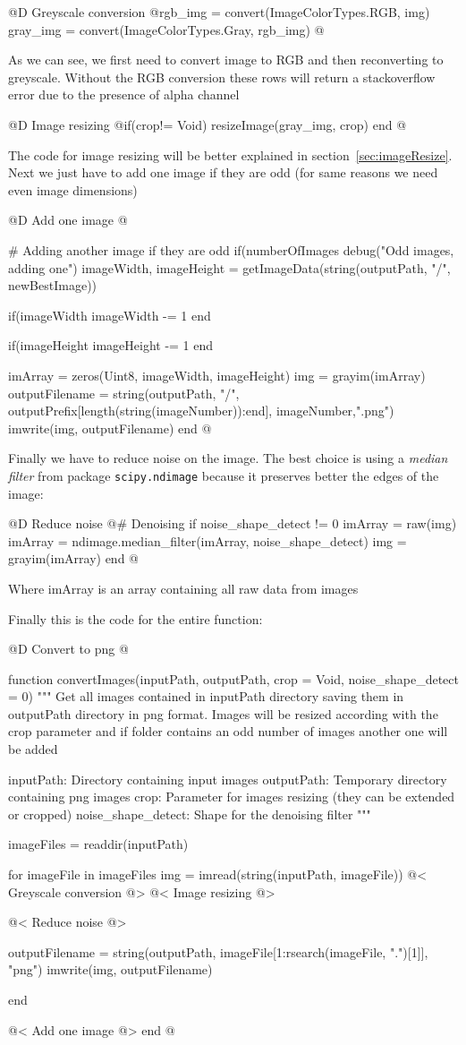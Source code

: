 \documentclass[11pt,oneside]{article}	%
\begin{document}
@D Greyscale conversion
@{rgb_img = convert(Image{ColorTypes.RGB}, img)
gray_img = convert(Image{ColorTypes.Gray}, rgb_img) @}
    
As we can see, we first need to convert image to RGB and then reconverting to greyscale. Without the RGB conversion these rows will return a stackoverflow error due to the presence of alpha channel


@D Image resizing
@{if(crop!= Void)
  resizeImage(gray_img, crop)
end @}
    
The code for image resizing will be better explained in section~\ref{sec:imageResize}.
Next we just have to add one image if they are odd (for same reasons we need even image dimensions)
    
@D Add one image
@{# Adding another image if they are odd
if(numberOfImages %
  debug("Odd images, adding one")  
  imageWidth, imageHeight = getImageData(string(outputPath, "/", newBestImage))
  
  if(imageWidth %
    imageWidth -= 1
  end
  
  if(imageHeight %
    imageHeight -= 1
  end  
  
  imArray = zeros(Uint8, imageWidth, imageHeight)
  img = grayim(imArray)
  outputFilename = string(outputPath, "/", 
		      outputPrefix[length(string(imageNumber)):end], imageNumber,".png")
  imwrite(img, outputFilename)
end @}


Finally we have to reduce noise on the image. The best choice is using a \textit{median filter} from package \texttt{scipy.ndimage} because it preserves better the edges of the image:

@D Reduce noise
@{# Denoising
if noise_shape_detect != 0
  imArray = raw(img)
  imArray = ndimage.median_filter(imArray, noise_shape_detect)
  img = grayim(imArray)
end @}

Where imArray is an array containing all raw data from images

Finally this is the code for the entire function:

@D Convert to png
@{function convertImages(inputPath, outputPath,
                       crop = Void, noise_shape_detect = 0)
  """
  Get all images contained in inputPath directory
  saving them in outputPath directory in png format.
  Images will be resized according with the crop parameter
  and if folder contains an odd number of images another one will be
  added

  inputPath: Directory containing input images
  outputPath: Temporary directory containing png images
  crop: Parameter for images resizing (they can be
        extended or cropped)
  noise_shape_detect: Shape for the denoising filter
  """

  imageFiles = readdir(inputPath)
  
  for imageFile in imageFiles
    img = imread(string(inputPath, imageFile))
    @< Greyscale conversion @>
    @< Image resizing @>

    @< Reduce noise @>
    
   outputFilename = string(outputPath, imageFile[1:rsearch(imageFile, ".")[1]], "png")
   imwrite(img, outputFilename)

  end

  @< Add one image @>
end
@}
\end{document}
